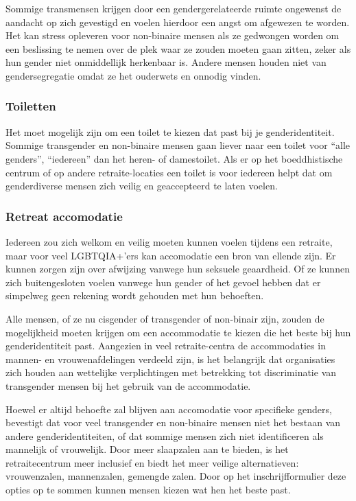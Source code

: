 \documentclass[12pt,openany]{book}
\begin{document}
Sommige transmensen krijgen door een gendergerelateerde ruimte ongewenst de aandacht op zich gevestigd en voelen hierdoor een angst om afgewezen te worden. Het kan stress opleveren voor non-binaire mensen als ze gedwongen worden om een beslissing te nemen over de plek waar ze zouden moeten gaan zitten, zeker als hun gender niet onmiddellijk herkenbaar is. Andere mensen houden niet van gendersegregatie omdat ze het ouderwets en onnodig vinden.

\subsubsection*{Toiletten}

Het moet mogelijk zijn om een toilet te kiezen dat past bij je genderidentiteit. Sommige transgender en non-binaire mensen gaan liever naar een toilet voor “alle genders”, “iedereen” dan het heren- of damestoilet. Als er op het boeddhistische centrum of op andere retraite-locaties een toilet is voor iedereen helpt dat om genderdiverse mensen zich veilig en geaccepteerd te laten voelen.

\subsubsection*{Retreat accomodatie}

Iedereen zou zich welkom en veilig moeten kunnen voelen tijdens een retraite, maar voor veel LGBTQIA+’ers kan accomodatie een bron van ellende zijn. Er kunnen zorgen zijn over afwijzing vanwege hun seksuele geaardheid. Of ze kunnen zich buitengesloten voelen vanwege hun gender of het gevoel hebben dat er simpelweg geen rekening wordt gehouden met hun behoeften. 

Alle mensen, of ze nu cisgender of transgender of non-binair zijn, zouden de mogelijkheid moeten krijgen om een accommodatie te kiezen die het beste bij hun genderidentiteit past. Aangezien in veel retraite-centra de accommodaties in mannen- en vrouwenafdelingen verdeeld zijn, is het belangrijk dat organisaties zich houden aan wettelijke verplichtingen met betrekking tot discriminatie van transgender mensen bij het gebruik van de accommodatie.

Hoewel er altijd behoefte zal blijven aan accomodatie voor specifieke genders, bevestigt dat voor veel transgender en non-binaire mensen niet het bestaan van andere genderidentiteiten, of dat sommige mensen zich niet identificeren als mannelijk of vrouwelijk. Door meer slaapzalen aan te bieden, is het retraitecentrum meer inclusief en biedt het meer veilige alternatieven: vrouwenzalen, mannenzalen, gemengde zalen. Door op het inschrijfformulier deze opties op te sommen kunnen mensen kiezen wat hen het beste past.
\end{document}
